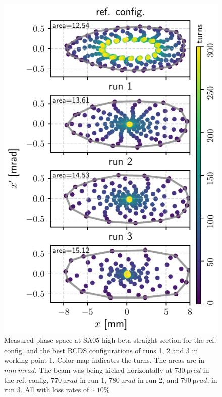 \documentclass[a4paper,
               keeplastbox,   %
               ]{jacow}
\begin{document}
\begin{figure}[!h]
    \centering
    \includegraphics[width=\columnwidth]{old_tunes_phase_and_area.pdf}
    \caption{Measured phase space at SA05 high-beta straight section for the ref. config. and the best RCDS configurations of runs 1, 2 and 3 in working point 1. Color-map indicates the turns. The areas are in $\unit{mm}~\unit{mrad}$. The beam was being kicked horizontally at $730~\unit{\micro rad}$ in the ref. config, $770~\unit{\micro rad}$ in run 1, $780~\unit{\micro rad}$ in run 2, and $790~\unit{\micro rad}$, in run 3. All with loss rates of  $\sim 10\%$} 
    \label{fig:oldtunes_phase}
\end{figure}
\end{document}
